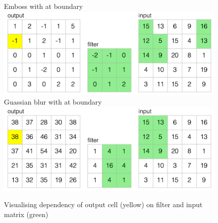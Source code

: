 \begin{figure}[H]
   \subcaptionbox
      {Emboss with  at boundary}
      {\includegraphics[scale=0.4]{fig/example/conv-wrap.png}}
   \subcaptionbox
      {Guassian blur with  at boundary}
      {\includegraphics[scale=0.4]{fig/example/conv-zero.png}}
   \caption{Visualising dependency of output cell (yellow) on filter and input matrix (green)}
\end{figure}
